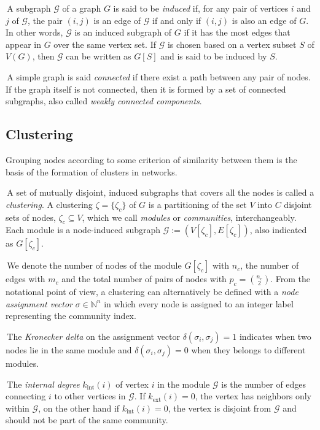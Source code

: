 \noindent\textbullet \,A subgraph $\mathcal{G}$ of a graph $G$ is said to be \emph{induced} if, for any pair of vertices $i$ and $j$ of $\mathcal{G}$, the pair $(i,j)$ is an edge of $\mathcal{G}$ if and only if $(i,j)$ is also an edge of $G$. In other words, $\mathcal{G}$ is an induced subgraph of $G$ if it has the most edges that appear in $G$ over the same vertex set. If $\mathcal{G}$ is chosen based on a vertex subset $S$ of $V(G)$, then $\mathcal{G}$ can be written as $G[S]$ and is said to be induced by $S$.

\noindent\textbullet \,A simple graph is said \emph{connected} if there exist a path between any pair of nodes. If the graph itself is not connected, then it is formed by a set of connected subgraphs, also called \emph{weakly connected components}.


\subsection{Clustering}\label{sec:clustering}
Grouping nodes according to some criterion of similarity between them is the basis of the formation of clusters in networks.

\noindent\textbullet \,A set of mutually disjoint, induced subgraphs that covers all the nodes is called a \emph{clustering}.
A clustering $\zeta = \{\zeta_c\}$ of $G$ is a partitioning of the set $V$ into $C$ disjoint sets of nodes, $\zeta_c \subseteq V$, which we call \emph{modules} or \emph{communities}, interchangeably. 
Each module is a node-induced subgraph $\mathcal{G}:=(V[\zeta_c],E[\zeta_c])$, also indicated as $G[\zeta_c]$.

\noindent\textbullet \,We denote the number of nodes of the module $G[\zeta_c]$ with $n_c$, the number of edges with $m_c$ and the total number of pairs of nodes with $p_c=\binom{n_c}{2}$.
From the notational point of view, a clustering can alternatively be defined with a \emph{node assignment vector} $\sigma \in \mathbb{N}^n$ in which every node is assigned to an integer label representing the community index. 

\noindent\textbullet \,The \emph{Kronecker delta} on the assignment vector $\delta(\sigma_i,\sigma_j)=1$ indicates when two nodes lie in the same module and $\delta(\sigma_i,\sigma_j)=0$ when they belongs to different modules.

\noindent\textbullet \,The \emph{internal degree} $k_{\textrm{int}}(i)$ of vertex $i$ in the module $\mathcal{G}$ is the number of edges connecting $i$ to other vertices in $\mathcal{G}$. If $k_{\textrm{ext}}(i)=0$, the vertex has neighbors only within $\mathcal{G}$, on the other hand if $k_{\textrm{int}}(i)=0$, the vertex is disjoint from $\mathcal{G}$ and should not be part of the same community.


